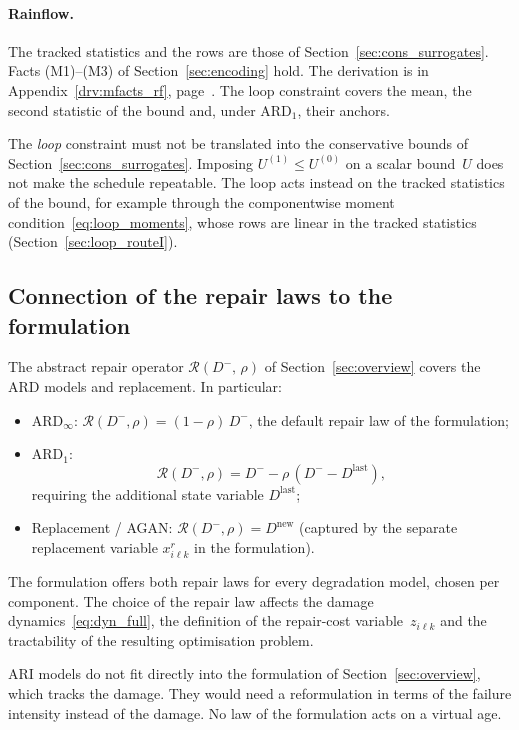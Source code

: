 \documentclass[11pt,a4paper]{article}
\theoremstyle{plain}
\theoremstyle{definition}
\theoremstyle{remark}
\begin{document}
\paragraph{Rainflow.}
The tracked statistics and the rows are those of Section~\ref{sec:cons_surrogates}.
Facts (M1)--(M3) of Section~\ref{sec:encoding} hold.
The derivation is in Appendix~\ref{drv:mfacts_rf}, page~\pageref{drv:mfacts_rf}.
The loop constraint covers the mean, the second statistic of the bound and, under $\text{ARD}_1$, their anchors.


The \emph{loop} constraint must not be translated into the conservative bounds of Section~\ref{sec:cons_surrogates}.
Imposing $U^{(1)} \le U^{(0)}$ on a scalar bound~$U$ does not make the schedule repeatable.
The loop acts instead on the tracked statistics of the bound, for example through the componentwise moment condition~\eqref{eq:loop_moments}, whose rows are linear in the tracked statistics (Section~\ref{sec:loop_routeI}).

\subsection{Connection of the repair laws to the formulation}
\label{sec:repair_connection}

The abstract repair operator $\mathcal{R}(D^-,\,\rho)$ of Section~\ref{sec:overview} covers the ARD models and replacement.
In particular:
\begin{itemize}
  \item $\text{ARD}_\infty$: $\mathcal{R}(D^-,\rho) = (1-\rho)\,D^-$, the default repair law of the formulation;
  \item $\text{ARD}_1$:
    \begin{equation}
      \mathcal{R}(D^-,\rho) = D^- - \rho\,(D^- - D^{\mathrm{last}}),
    \end{equation}
    requiring the additional state variable $D^{\mathrm{last}}$;
  \item Replacement / AGAN: $\mathcal{R}(D^-,\rho) = D^{\mathrm{new}}$ (captured by the separate replacement variable $x^r_{i\ell k}$ in the formulation).
\end{itemize}
The formulation offers both repair laws for every degradation model, chosen per component.
The choice of the repair law affects the damage dynamics~\eqref{eq:dyn_full}, the definition of the repair-cost variable~$z_{i\ell k}$ and the tractability of the resulting optimisation problem.

ARI models do not fit directly into the formulation of Section~\ref{sec:overview}, which tracks the damage.
They would need a reformulation in terms of the failure intensity instead of the damage.
No law of the formulation acts on a virtual age.
\end{document}
